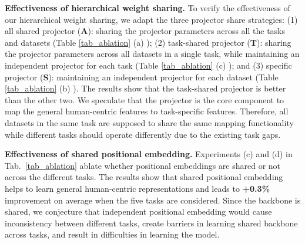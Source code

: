 \documentclass[10pt,twocolumn,letterpaper]{article}
\begin{document}
\noindent \textbf{Effectiveness of hierarchical weight sharing.}
To verify the effectiveness of our hierarchical weight sharing, we adapt the three projector share strategies: (1) all shared projector (\textbf{A}): sharing the projector parameters across all the tasks and datasets (Table \ref{tab_ablation} (a) ); (2) task-shared projector (\textbf{T}): sharing the projector parameters across all datasets in a single task, while maintaining an independent projector for each task (Table \ref{tab_ablation} (c) ); and (3) specific projector (\textbf{S}): maintaining an independent projector for each dataset (Table \ref{tab_ablation} (b) ).  The results show that the task-shared projector is better than the other two. We speculate that the projector is the core component to map the general human-centric features to task-specific features. Therefore, all datasets in the same task are supposed to share the same mapping functionality while different tasks 
should operate differently due to the existing task gaps.




\noindent \textbf{Effectiveness of shared positional embedding.}
Experiments (c) and (d) in Tab.~\ref{tab_ablation} ablate whether positional embeddings are shared or not across the different tasks. The results show that shared positional embedding helps to learn general human-centric representations and leads to \textbf{+0.3\%} improvement on average when the five tasks are considered. Since the backbone is shared, we conjecture that independent positional embedding would cause inconsistency between different tasks, create barriers in learning shared backbone across tasks, and result in difficulties in learning the model.
\end{document}
